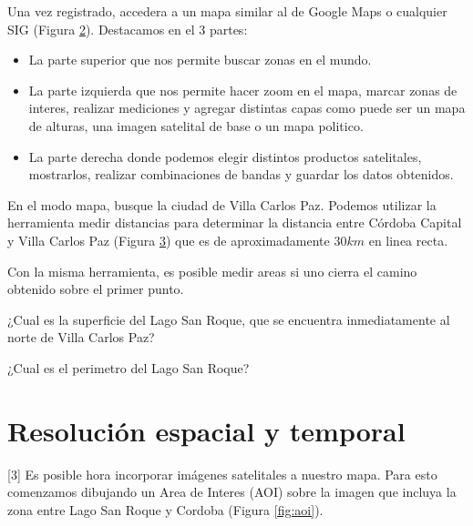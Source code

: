 \documentclass[a4paper,10pt]{article}
\begin{document}
\begin{figure}[h!]
    \centering
    \caption{}
    \label{fig:registro}
\end{figure}

Una vez registrado, accedera a un mapa  similar al de Google Maps o cualquier SIG (Figura \ref{fig:mapa}). Destacamos en el 3 partes:

\begin{figure}[h!]
    \centering
    \caption{}
    \label{fig:mapa}
\end{figure}

\begin{itemize}
    \item La parte superior que nos permite buscar zonas en el mundo.
    \item La parte izquierda que nos permite hacer zoom en el mapa, marcar zonas de interes, realizar mediciones y agregar distintas capas como puede ser un mapa de alturas, una imagen satelital de base o un mapa politico.
    \item La parte derecha donde podemos elegir distintos productos satelitales, mostrarlos, realizar combinaciones de bandas y guardar los datos obtenidos.
\end{itemize}

En el modo mapa, busque la ciudad de Villa Carlos Paz. Podemos utilizar la herramienta medir distancias para determinar la distancia entre Córdoba Capital y Villa Carlos Paz (Figura \ref{fig:distancia}) que es de aproximadamente $30km$ en linea recta.

\begin{figure}[h!]
    \centering
    \caption{}
    \label{fig:distancia}
\end{figure}

Con la misma herramienta, es posible medir areas si uno cierra el camino obtenido sobre el primer punto.

\begin{que}
    ¿Cual es la superficie del Lago San Roque, que se encuentra inmediatamente al norte de Villa Carlos Paz?
\end{que}

\begin{que}
    ¿Cual es el perimetro del Lago San Roque?
\end{que}

\section{Resolución espacial y temporal} [3]
Es posible hora incorporar imágenes satelitales a nuestro mapa. Para esto comenzamos dibujando un Area de Interes (AOI) sobre la imagen que incluya la zona entre Lago San Roque y Cordoba (Figura \ref{fig:aoi}).
\end{document}
